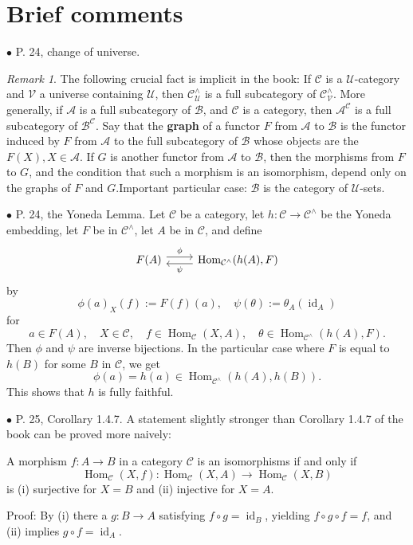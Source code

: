 \documentclass[12pt]{article}
\theoremstyle{remark}%
\newtheorem{rk}[thm]{Remark}%
\newcommand{\bu}{\bullet}
\newcommand{\n}{\noindent}
\newcommand{\A}{\mathcal A}
\newcommand{\B}{\mathcal B}
\newcommand{\C}{\mathcal C}
\newcommand{\U}{\mathcal U}
\DeclareMathOperator{\id}{id}
\DeclareMathOperator{\Hom}{Hom}
\begin{document}
\section{Brief comments}\label{bc}%
%
\n$\bu$ P. 24, change of universe. 
% 
\begin{rk}\label{graph} 
The following crucial fact is implicit in the book: If $\C$ is a $\U$-category and $\mathcal V$ a universe containing $\U$, then $\C^\wedge_\U$ is a full subcategory of $\C^\wedge_\mathcal{V}$. More generally, if $\A$ is a full subcategory of $\B$, and $\C$ is a category, then $\A^\C$ is a full subcategory of $\B^\C$. Say that the \textbf{graph} of a functor $F$ from $\A$ to $\B$ is the functor induced by $F$ from $\A$ to the full subcategory of $\B$ whose objects are the $F(X),X\in\A$. If $G$ is another functor from $\A$ to $\B$, then the morphisms from $F$ to $G$, and the condition that such a morphism is an isomorphism, depend only on the graphs of $F$ and $G$.Important particular case: $\B$ is the category of $\U$-sets. 
\end{rk} 

%

\n$\bu$ P. 24, the Yoneda Lemma. Let $\C$ be a category, let $h:\C\to\C^\wedge$ be the Yoneda embedding, let $F$ be in $\C^\wedge$, let $A$ be in $\C$, and define 
$$
\begin{tikzcd} 
F(A)\ar[yshift=0.7ex]{r}{\phi}&\Hom_{\C^\wedge}(h(A),F)\ar[yshift=-0.7ex]{l}{\psi}
\end{tikzcd}
$$
by 
$$
\phi(a)_X(f):=F(f)(a),\quad\psi(\theta):=\theta_A(\id_A)
$$
for 
$$
a\in F(A),\quad X\in\C,\quad f\in\Hom_\C(X,A),\quad\theta\in\Hom_{\C^\wedge}(h(A),F).
$$ 
Then $\phi$ and $\psi$ are inverse bijections. In the particular case where $F$ is equal to $h(B)$ for some $B$ in $\C$, we get 
$$
\phi(a)=h(a)\in\Hom_{\C^\wedge}(h(A),h(B)).
$$
This shows that $h$ is fully faithful. 


\n$\bu$ P. 25, Corollary 1.4.7. A statement slightly stronger than Corollary 1.4.7 of the book can be proved more naively:

A morphism $f:A\to B$ in a category $\C$ is an isomorphisms if and only if 
$$
\Hom_\C(X,f):\Hom_\C(X,A)\to\Hom_\C(X,B)
$$
is (i) surjective for $X=B$ and (ii) injective for $X=A$.

Proof: By (i) there a $g:B\to A$ satisfying $f\circ g=\id_B$, yielding $f\circ g\circ f=f$, and (ii) implies $g\circ f=\id_A$. 

\end{document}

